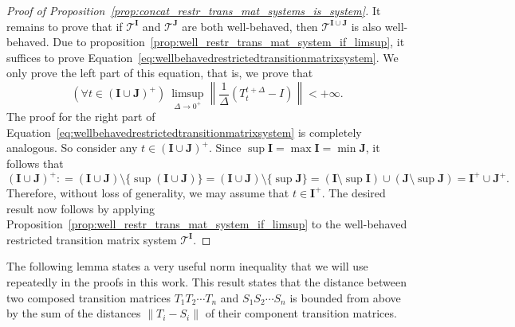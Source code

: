\documentclass[10pt,a4paper]{paper}
\theoremstyle{definition}
\newcommand{\reals}{\mathbb{R}}
\newcommand{\realspos}{\reals_{>0}}
\newcommand{\norm}[1]{\left\lVert #1 \right\rVert}
\newcommand{\coloneqq}{:\!=}
\begin{document}
\begin{proof}[Proof of Proposition~\ref{prop:concat_restr_trans_mat_systems_is_system}]
It remains to prove that if $\mathcal{T}^{\mathbf{I}}$ and $\mathcal{T}^{\mathbf{J}}$ are both well-behaved, then $\mathcal{T}^{\mathbf{I}\cup\mathbf{J}}$ is also well-behaved. Due to proposition~\ref{prop:well_restr_trans_mat_system_if_limsup}, it suffices to prove Equation~\eqref{eq:wellbehavedrestrictedtransitionmatrixsystem}. We only prove the left part of this equation, that is, we prove that
\begin{equation*}
\left(\forall t\in(\mathbf{I}\cup\mathbf{J})^+\right)~\limsup_{\Delta\to0^+}\norm{\frac{1}{\Delta}\left(T_t^{t+\Delta} - I\right)} < +\infty.
\end{equation*}
The proof for the right part of Equation~\eqref{eq:wellbehavedrestrictedtransitionmatrixsystem} is completely analogous. So consider any $t\in(\mathbf{I}\cup\mathbf{J})^+$. Since $\sup\mathbf{I}=\max\mathbf{I}=\min\mathbf{J}$, it follows that
\begin{equation*}
(\mathbf{I}\cup\mathbf{J})^+
\coloneqq
(\mathbf{I}\cup\mathbf{J})\setminus\{\sup(\mathbf{I}\cup\mathbf{J})\}=(\mathbf{I}\cup\mathbf{J})\setminus\{\sup\mathbf{J}\}
=(\mathbf{I}\setminus\sup\mathbf{I})\cup(\mathbf{J}\setminus\sup\mathbf{J})=\mathbf{I}^+\cup\mathbf{J}^+.
\end{equation*}
Therefore, without loss of generality, we may assume that $t\in\mathbf{I}^+$. The desired result now follows by applying Proposition~\ref{prop:well_restr_trans_mat_system_if_limsup} to the well-behaved restricted transition matrix system $\mathcal{T}^\mathbf{I}$.
\end{proof}

The following lemma states a very useful norm inequality that we will use repeatedly in the proofs in this work. This result states that the distance between two composed transition matrices $T_1T_2\cdots T_n$ and $S_1S_2\cdots S_n$ is bounded from above by the sum of the distances $\norm{T_i - S_i}$ of their component transition matrices.
\end{document}
